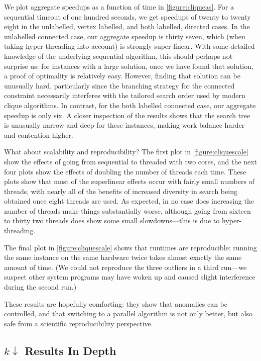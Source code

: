 \documentclass[sigconf]{acmart}
\begin{document}
We plot aggregate speedups as a function of time in \cref{figure:cliqueas}. For a sequential timeout
of one hundred seconds, we get speedups of twenty to twenty eight in the unlabelled, vertex
labelled, and both labelled, directed cases. In the unlabelled connected case, our aggregate speedup
is thirty seven, which (when taking hyper-threading into account) is strongly super-linear.  With
some detailed knowledge of the underlying sequential algorithm, this should perhaps not surprise us:
for instances with a large solution, once we have found that solution, a proof of optimality is
relatively easy. However, finding that solution can be unusually hard, particularly since the
branching strategy for the connected constraint necessarily interferes with the tailored search
order used by modern clique algorithms.  In contrast, for the both labelled connected case, our
aggregate speedup is only six. A closer inspection of the results shows that the search tree is
unusually narrow and deep for these instances, making work balance harder and contention higher.

What about scalability and reproducibility? The first plot in \cref{figure:cliquescale} show the
effects of going from sequential to threaded with two cores, and the next four plots show the
effects of doubling the number of threads each time. These plots show that most of the superlinear
effects occur with fairly small numbers of threads, with nearly all of the benefits of increased
diversity in search being obtained once eight threads are used. As expected, in no case does
increasing the number of threads make things substantially worse, although going from sixteen to
thirty two threads does show some small slowdowns---this is due to hyper-threading.

The final plot in \cref{figure:cliquescale} shows that runtimes are reproducible: running the same
instance on the same hardware twice takes almost exactly the same amount of time. (We could not
reproduce the three outliers in a third run---we suspect other system programs may have woken up
and caused slight interference during the second run.)

These results are hopefully comforting: they show that anomalies can be controlled, and that
switching to a parallel algorithm is not only better, but also safe from a scientific
reproducibility perspective.

\subsection{$k{\downarrow}$ Results In Depth}
\end{document}
